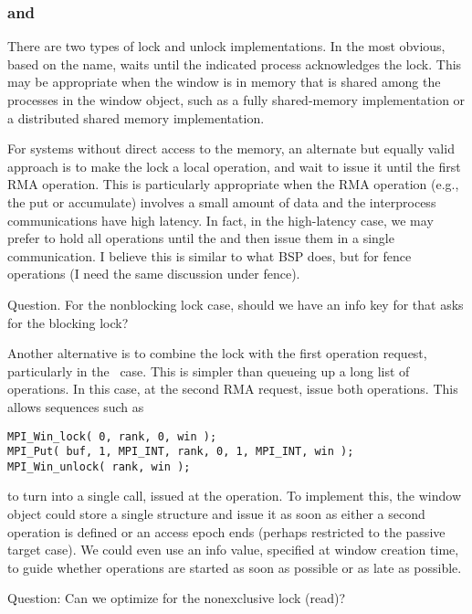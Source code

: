 \documentclass{article}
\begin{document}
\subsubsection{ and }
There are two types of lock and unlock implementations.  In the most
obvious, based on the name,  waits until the
indicated process acknowledges the lock. This may be appropriate when the
window is in memory that is shared among the processes in the window
object, such as a fully shared-memory implementation or a distributed
shared memory implementation.

For systems without direct access to the memory, an alternate but
equally valid approach is to make the lock a local operation, and wait
to issue it until the first RMA operation.  This is particularly
appropriate when the RMA operation (e.g., the put or accumulate)
involves a small amount of data and the interprocess communications
have high latency.  In fact, in the high-latency case, we may prefer
to hold all operations until the  and then issue
them in a single communication.  I believe this is similar to what BSP
does, but for fence operations (I need the same discussion under fence).

Question.  For the nonblocking lock case, should we have an info key
for  that asks for the blocking lock?  

Another alternative is to combine the lock with the first operation
request, particularly in the \tcpname\ case.  This is simpler than
queueing up a long list of operations.  In this case, at the second
RMA request, issue both operations.  This allows sequences such as
\begin{verbatim}
MPI_Win_lock( 0, rank, 0, win );
MPI_Put( buf, 1, MPI_INT, rank, 0, 1, MPI_INT, win );
MPI_Win_unlock( rank, win );
\end{verbatim}
to turn into a single  call, issued at the
 operation.  To implement this, the window
object could store a single  structure and
issue it as soon as either a second operation is defined or an access
epoch ends (perhaps restricted to the passive target case).  We could
even use an info value, specified at window creation time, to guide
whether operations are started as soon as possible or as late as possible.

Question: Can we optimize for the nonexclusive lock (read)?  
\end{document}
